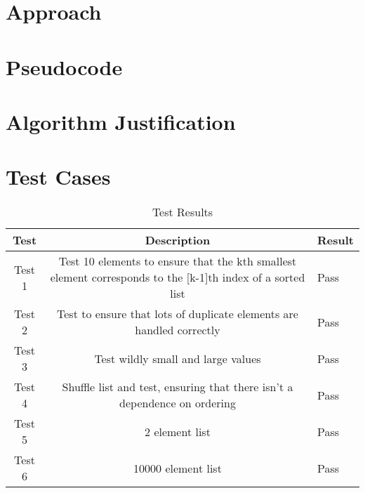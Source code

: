 \documentclass{labReport}
\begin{document}
\newpage
\begin{multicols*}{2}
\raggedcolumns



\section{Approach}

\section{Pseudocode}

\section{Algorithm Justification}



\section{Test Cases}
\begin{table}[h!]
    \centering
    \begin{tabular}{|c|c|}
    \hline
    Test & Description & Result \\
    \hline
    Test 1 & Test 10 elements to ensure that the kth smallest element corresponds to the [k-1]th index of a sorted list & Pass \\
    Test 2 & Test to ensure that lots of duplicate elements are handled correctly & Pass \\
    Test 3 & Test wildly small and large values & Pass \\
    Test 4 & Shuffle list and test, ensuring that there isn't a dependence on ordering & Pass \\
    Test 5 & 2 element list & Pass \\
    Test 6 & 10000 element list & Pass \\
    \hline
    \end{tabular}
    \caption{Test Results}
    \label{table:test_results}
\end{table}


\end{multicols*}
\end{document}
